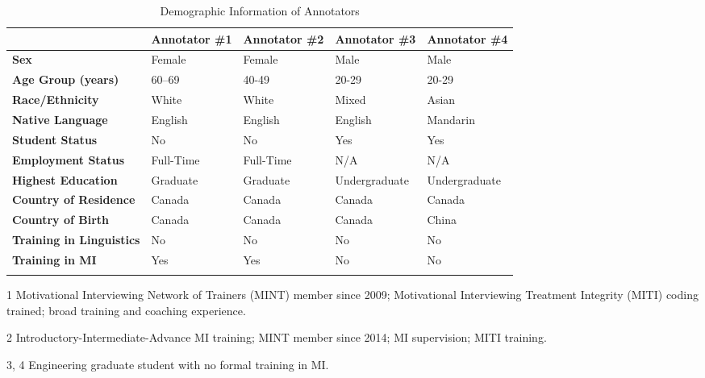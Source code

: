 \renewcommand{\arraystretch}{1.1} %

\begin{table}[!ht]
\centering
\begin{threeparttable}
\caption{Demographic Information of Annotators}
\label{tab:annotator-demographics}
\begin{tabular}{%
  @{}p{}
  p{}
  p{}
  p{}
  p{}@{}}
\toprule
 & \textbf{Annotator \#1\tnote{1}} 
 & \textbf{Annotator \#2\tnote{2}} 
 & \textbf{Annotator \#3\tnote{3, 4}}
 & \textbf{Annotator \#4\tnote{3, 4}} \\
\midrule
\arrayrulecolor{gray!50} 
\textbf{Sex} & Female & Female & Male & Male\\
\hline
\textbf{Age Group (years)} & 60--69 & 40-49 & 20-29 &20-29 \\
\hline
\textbf{Race/Ethnicity} & White & White & Mixed & Asian\\
\hline
\textbf{Native Language} & English & English & English & Mandarin\\
\hline
\textbf{Student Status} & No & No & Yes & Yes\\
\hline
\textbf{Employment Status} & Full-Time & Full-Time & N/A & N/A\\
\hline
\textbf{Highest Education} & Graduate & Graduate & Undergraduate & Undergraduate \\
\hline
\textbf{Country of Residence} & Canada & Canada & Canada & Canada\\
\hline
\textbf{Country of Birth} & Canada & Canada & Canada & China\\
\hline
\textbf{Training in Linguistics} & No & No & No& No\\
\hline
\textbf{Training in MI} & Yes & Yes & No & No\\
\arrayrulecolor{black}
\bottomrule
\end{tabular}

\begin{tablenotes}
\footnotesize
\item[1] 
 Motivational Interviewing Network of Trainers (MINT) member since 2009; 
 Motivational Interviewing Treatment Integrity (MITI) coding trained; broad training
 and coaching experience.
\item[2]
 Introductory-Intermediate-Advance MI training;
 MINT member since 2014;
 MI supervision; MITI training.
 \item[3, 4]
 Engineering graduate student with no formal training in MI.
\end{tablenotes}

\end{threeparttable}
\end{table}
